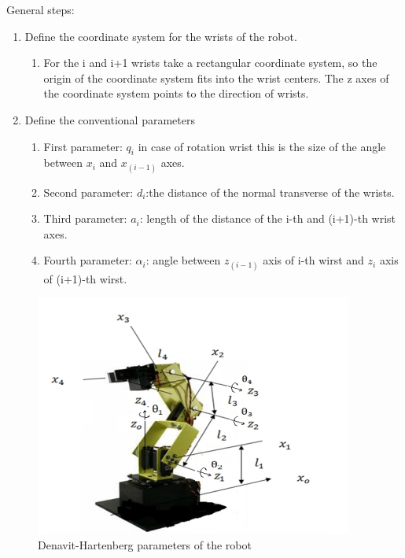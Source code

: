 General steps:
	\begin{enumerate}
			\item Define the coordinate system for the wrists of the robot.\\
			\begin{enumerate}
				\item For the i and i+1 wrists take a rectangular coordinate system, so the origin of the coordinate system fits into the wrist centers. The z axes of the coordinate system points to the direction of wrists. \\
			\end{enumerate}
			\item Define the conventional parameters \\
			
			\begin{enumerate}
				\item First parameter: $q_i$ in case of rotation wrist this is the size of the angle between $x_i$ and $x_(i-1)$ axes. \\
				\item Second parameter: $d_i$:the distance of the normal transverse of the wrists. \\
				\item Third parameter: $a_i$: length of the distance of the i-th and (i+1)-th wrist axes. \\
				\item Fourth parameter:  $\alpha _i$: angle between $z_(i-1)$ axis of i-th wirst and $z_i$ axis of (i+1)-th  wirst. \\
			\end{enumerate}
		\end{enumerate}
		
		\begin{figure}[H]
			\centering
			\includegraphics[scale=1.2]{./images/denavit_parameters}
			\caption{Denavit-Hartenberg parameters of the robot}
		\end{figure}
		
